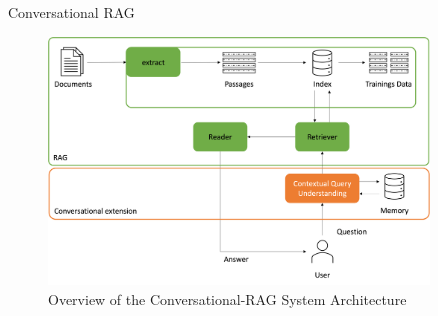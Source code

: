 \documentclass{beamer}
\begin{document}
\begin{frame}{Conversational RAG}

  \vfill
  \begin{figure}
    \includegraphics[width=0.9\textwidth]{Grafiken/System_Architecture.png}
    \caption{Overview of the Conversational-RAG System Architecture}
  \end{figure}
  \vfill

\end{frame}
\end{document}
